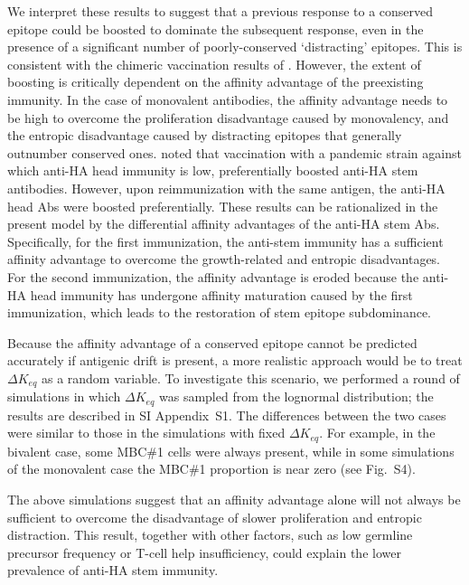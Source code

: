 \documentclass[utf8]{frontiersHLTH}%
\newcommand{\vo}[1]{#1} %
\newcommand{\SI}{SI Appendix}
\begin{document}
We interpret these results to suggest that a previous response to a conserved
epitope could be boosted to dominate the subsequent response, even in the
presence of a significant number of poorly-conserved `distracting'
epitopes.  This is consistent with the chimeric vaccination results of
\citet{nachbagauer17a}. However, the extent of boosting is
critically dependent on the affinity advantage of the preexisting
immunity. In the case of monovalent antibodies, the affinity
advantage needs to be high to \vo{overcome} the proliferation
disadvantage caused by monovalency, and the entropic disadvantage
caused by distracting epitopes that generally outnumber conserved ones.
\citet{ellebedy14} noted that vaccination with a pandemic strain against
which anti-HA head immunity is low, preferentially boosted anti-HA stem
antibodies. However, upon reimmunization with the same antigen, the
anti-HA head Abs were boosted preferentially. These results can be
rationalized in the present model by the
differential affinity advantages of the anti-HA stem Abs.  Specifically, for the first
immunization, the anti-stem immunity has a sufficient affinity advantage
to overcome the growth-related and entropic disadvantages. For the second
immunization, the affinity advantage is eroded because the anti-HA head
immunity has undergone affinity maturation caused by the first
immunization, which leads to the restoration of stem epitope
subdominance.

Because the affinity advantage of a conserved epitope cannot be predicted
accurately if antigenic drift is present, a more realistic approach would
be to treat $\Delta K_{eq}$ as a random variable. To investigate this
scenario, we performed a round of simulations in which $\Delta K_{eq}$
was sampled from the lognormal distribution; the results are described in
\SI~S1. The differences between the
two cases were similar to those in the simulations with
fixed $\Delta K_{eq}$. For example, in the bivalent case, some MBC\#1
cells were always present, while in some simulations of the
monovalent case the MBC\#1 proportion is near zero (see Fig.~S4).

The above simulations suggest that an affinity advantage alone will not always be
sufficient to overcome the disadvantage of slower proliferation and
entropic distraction. This result, together with other factors, such as low
germline precursor frequency or T-cell help insufficiency,\cite{tan19}
could explain the lower prevalence of anti-HA stem immunity.
\end{document}
